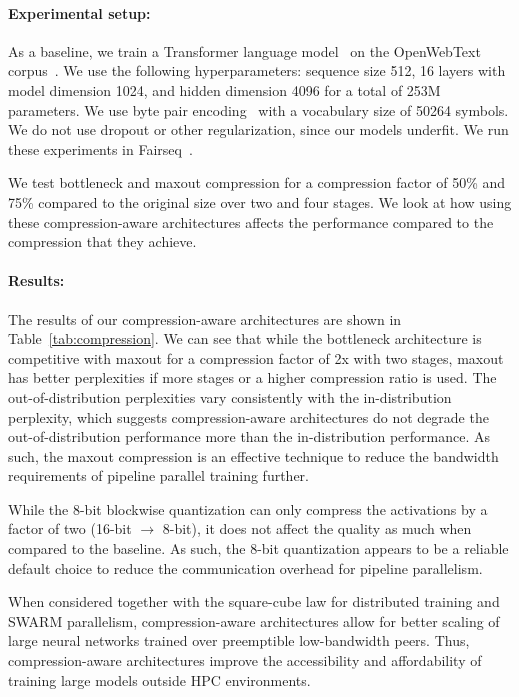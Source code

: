 \vspace{-6pt}
\paragraph{Experimental setup:}

As a baseline, we train a Transformer language model~\citep{transformer} on the OpenWebText corpus~\citep{gokaslan2019openwebtext}. We use the following hyperparameters: sequence size 512, 16 layers with model dimension 1024, and hidden dimension 4096 for a total of 253M parameters. We use byte pair encoding~\citep{sennrich-etal-2016-neural,radford2019language} with a vocabulary size of 50264 symbols. We do not use dropout or other regularization, since our models underfit. We run these experiments in Fairseq~\citep{Ott2019fairseqAF}.

We test bottleneck and maxout compression for a compression factor of 50\% and 75\% compared to the original size over two and four stages. We look at how using these compression-aware architectures affects the performance compared to the compression that they achieve.
\vspace{-6pt}

\paragraph{Results:} The results of our compression-aware architectures are shown in Table~\ref{tab:compression}. We can see that while the bottleneck architecture is competitive with maxout for a compression factor of 2x with two stages, maxout has better perplexities if more stages or a higher compression ratio is used. The out-of-distribution perplexities vary consistently with the in-distribution perplexity, which suggests compression-aware architectures do not degrade the out-of-distribution performance more than the in-distribution performance. As such, the maxout compression is an effective technique to reduce the bandwidth requirements of pipeline parallel training further.

While the 8-bit blockwise quantization can only compress the activations by a factor of two (16-bit $\rightarrow$ 8-bit), it does not affect the quality as much when compared to the baseline. As such, the 8-bit quantization appears to be a reliable default choice to reduce the communication overhead for pipeline parallelism.

When considered together with the square-cube law for distributed training and SWARM parallelism, compression-aware architectures allow for better scaling of large neural networks trained over preemptible low-bandwidth peers. Thus, compression-aware architectures improve the accessibility and affordability of training large models outside HPC environments.


